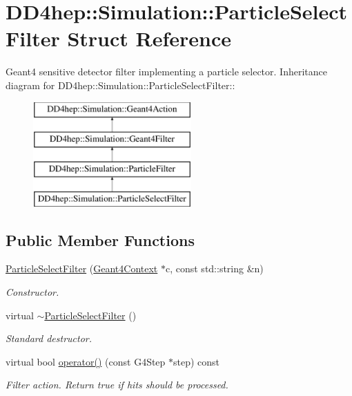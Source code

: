\hypertarget{struct_d_d4hep_1_1_simulation_1_1_particle_select_filter}{
\section{DD4hep::Simulation::ParticleSelectFilter Struct Reference}
\label{struct_d_d4hep_1_1_simulation_1_1_particle_select_filter}
}


Geant4 sensitive detector filter implementing a particle selector.  
Inheritance diagram for DD4hep::Simulation::ParticleSelectFilter::\begin{figure}[H]
\begin{center}
\leavevmode
\includegraphics[height=4cm]{struct_d_d4hep_1_1_simulation_1_1_particle_select_filter}
\end{center}
\end{figure}
\subsection*{Public Member Functions}
\begin{DoxyCompactItemize}
\item 
\hyperlink{struct_d_d4hep_1_1_simulation_1_1_particle_select_filter_a02e58fea6995a7e71f4ea2ea3bb4696e}{ParticleSelectFilter} (\hyperlink{class_d_d4hep_1_1_simulation_1_1_geant4_context}{Geant4Context} $\ast$c, const std::string \&n)
\begin{DoxyCompactList}\small\item\em Constructor. \item\end{DoxyCompactList}\item 
virtual \hyperlink{struct_d_d4hep_1_1_simulation_1_1_particle_select_filter_aee798c7febdef997d9288130d8c08d0f}{$\sim$ParticleSelectFilter} ()
\begin{DoxyCompactList}\small\item\em Standard destructor. \item\end{DoxyCompactList}\item 
virtual bool \hyperlink{struct_d_d4hep_1_1_simulation_1_1_particle_select_filter_a4d0d7fb1f0c8f552f5d8940405a3bbe2}{operator()} (const G4Step $\ast$step) const 
\begin{DoxyCompactList}\small\item\em Filter action. Return true if hits should be processed. \item\end{DoxyCompactList}\end{DoxyCompactItemize}


